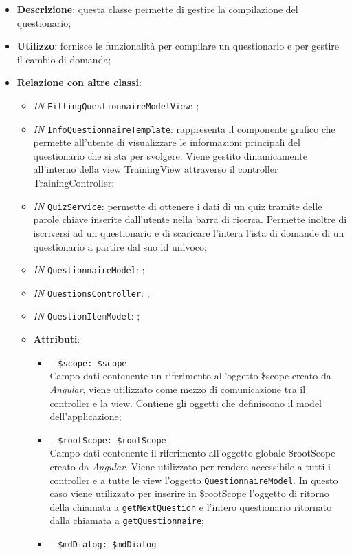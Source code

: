 \begin{itemize}
	\item \textbf{Descrizione}: questa classe permette di gestire la compilazione del questionario;
	\item \textbf{Utilizzo}: fornisce le funzionalità per compilare un questionario e per gestire il cambio di domanda;
	\item \textbf{Relazione con altre classi}:
	\begin{itemize}
		\item \textit{IN} \texttt{FillingQuestionnaireModelView}: ;  
		\item \textit{IN} \texttt{InfoQuestionnaireTemplate}: rappresenta il componente grafico che permette all'utente di visualizzare le informazioni principali del questionario che si sta per svolgere. Viene gestito dinamicamente all'interno della view TrainingView attraverso il controller TrainingController;
		\item \textit{IN} \texttt{QuizService}: permette di ottenere i dati di un quiz tramite delle parole chiave inserite dall'utente nella barra di ricerca. Permette inoltre di iscriversi ad un questionario e di scaricare l'intera l'ista di domande di un questionario a partire dal suo id univoco;
		\item \textit{IN} \texttt{QuestionnaireModel}: ;
		\item \textit{IN} \texttt{QuestionsController}: ; 
		\item \textit{IN} \texttt{QuestionItemModel}: ;
	\item \textbf{Attributi}:
	\begin{itemize}
		\item \texttt{-} \texttt{\$scope: \$scope} \\
		Campo dati contenente un riferimento all’oggetto \$scope creato da \textit{Angular}, viene utilizzato come mezzo di comunicazione tra il controller e la view. Contiene gli oggetti che definiscono il model dell’applicazione;
		\item \texttt{-} \texttt{\$rootScope: \$rootScope} \\
		Campo dati contenente il riferimento all'oggetto globale \$rootScope creato da \textit{Angular}. Viene utilizzato per rendere accessibile a tutti i controller e a tutte le view l'oggetto \texttt{QuestionnaireModel}. In questo caso viene utilizzato per inserire in \$rootScope l'oggetto di ritorno della chiamata a \texttt{getNextQuestion} e l'intero questionario ritornato dalla chiamata a \texttt{getQuestionnaire};
		\item \texttt{-} \texttt{\$mdDialog: \$mdDialog} \\

\end{itemize}
\end{itemize}
\end{itemize}
